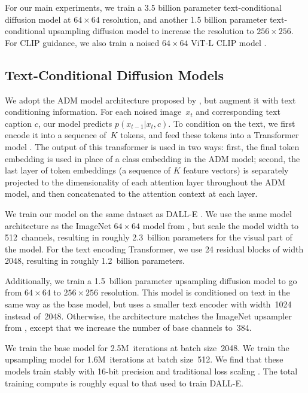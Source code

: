 \documentclass{article}
\begin{document}
For our main experiments, we train a 3.5 billion parameter text-conditional diffusion model at $64 \times 64$ resolution, and another 1.5 billion parameter text-conditional upsampling diffusion model to increase the resolution to $256 \times 256$. For CLIP guidance, we also train a noised $64 \times 64$ ViT-L CLIP model \citep{vit}.

\subsection{Text-Conditional Diffusion Models}

We adopt the ADM model architecture proposed by \citet{sotapaper}, but augment it with text conditioning information. For each noised image~$x_t$ and corresponding text caption $c$, our model predicts $p(x_{t-1}|x_t, c)$. To condition on the text, we first encode it into a sequence of~$K$ tokens, and feed these tokens into a Transformer model \citep{transformer}. The output of this transformer is used in two ways: first, the final token embedding is used in place of a class embedding in the ADM model; second, the last layer of token embeddings (a sequence of $K$ feature vectors) is separately projected to the dimensionality of each attention layer throughout the ADM model, and then concatenated to the attention context at each layer.

We train our model on the same dataset as DALL-E \citep{dalle}. We use the same model architecture as the ImageNet $64 \times 64$ model from \citet{sotapaper}, but scale the model width to 512~channels, resulting in roughly 2.3~billion parameters for the visual part of the model. For the text encoding Transformer, we use 24 residual blocks of width 2048, resulting in roughly 1.2~billion parameters.

Additionally, we train a 1.5~billion parameter upsampling diffusion model to go from $64 \times 64$ to $256 \times 256$ resolution. This model is conditioned on text in the same way as the base model, but uses a smaller text encoder with width~1024 instead of~2048. Otherwise, the architecture matches the ImageNet upsampler from \citet{sotapaper}, except that we increase the number of base channels to~384.

We train the base model for 2.5M~iterations at batch size~2048. We train the upsampling model for 1.6M~iterations at batch size~512. We find that these models train stably with 16-bit precision and traditional loss scaling \citep{lossscaling}. The total training compute is roughly equal to that used to train DALL-E.
\end{document}
